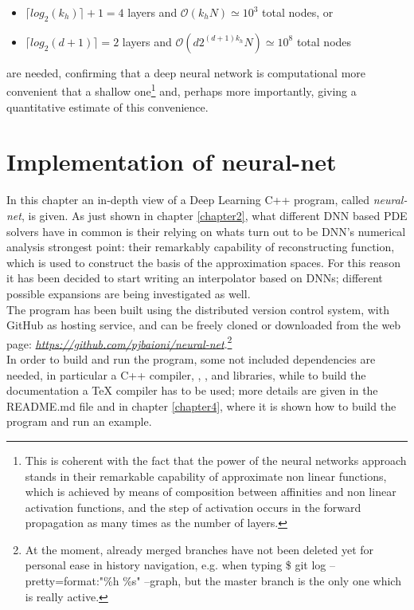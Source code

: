 \documentclass[12pt, a4paper]{report}
\theoremstyle{definition}
\begin{document}
{\begin{itemize}
	\item $\lceil log_2 (k_h)\rceil +1=4$ layers and $\mathcal O(k_hN)\simeq 10^3$ total nodes, or
	\item $\lceil log_2(d+1) \rceil = 2$ layers and $\mathcal O(d2^{(d+1)k_h}N)\simeq 10^8$ total nodes
\end{itemize}
are needed, confirming that a deep neural network is computational more convenient that a shallow one\footnote{This is coherent with the fact that the power of the neural networks approach stands in their remarkable capability of approximate non linear functions, which is achieved by means of composition between affinities and non linear activation functions, and the step of activation occurs in the forward propagation as many times as the number of layers.} and, perhaps more importantly, giving a quantitative estimate of this convenience.\\




\chapter{Implementation of neural-net}\label{chapter3}
\setcounter{figure}{8}
In this chapter an in-depth view of a Deep Learning C++ program, called \textit{neural-net}, is given. As just shown in chapter \ref{chapter2}, what different DNN based PDE solvers have in common is their relying on whats turn out to be DNN's numerical analysis strongest point: their remarkably capability of reconstructing function, which is used to construct the basis of the approximation spaces. For this reason it has been decided to start writing an interpolator based on DNNs; different possible expansions are being investigated as well.\\
The program has been built using the \cite{git} distributed version control system, with GitHub as hosting service, and can be freely cloned or downloaded from the web page: \href{https://github.com/pjbaioni/neural-net}{\emph{https://github.com/pjbaioni/neural-net}}.\footnote{At the moment, already merged branches have not been deleted yet for personal ease in history navigation, e.g. when typing {\ttfamily \$ git log --pretty=format:"\%h \%s" --graph}, but the master branch is the only one which is really active.}\\
In order to build and run the program, some not included dependencies are needed, in particular a C++ compiler, \cite{make}, \cite{gnuplot}, \cite{eigen} and \cite{boost} libraries, while to build the documentation a TeX compiler has to be used; more details are given in the README.md file and in chapter \ref{chapter4}, where it is shown how to build the program and run an example. 

}
\end{document}
